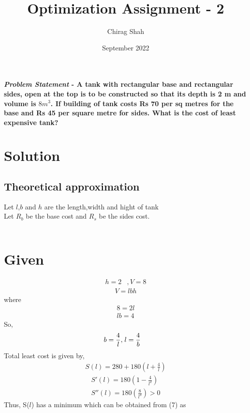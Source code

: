 \documentclass[journal,10pt,twocolumn]{article}
\title{\textbf{Optimization Assignment - 2}}
\author{Chirag Shah}
\date{September 2022}
\providecommand{\brak}[1]{\ensuremath{\left(#1\right)}}
\begin{document}
\maketitle
\paragraph{\textit{Problem Statement} - A tank with rectangular base and rectangular sides, open at the top is to be constructed so that its depth is 2 m and volume is $8 m^3$. If building of tank costs Rs 70 per sq metres for the base and Rs 45 per square metre for sides. What is the cost of least expensive tank?}

\section*{\large Solution}
\subsection*{\normalsize Theoretical approximation}
Let $l$,$b$ and $h$ are the length,width and hight of tank \\
Let $R_b$ be the base cost and $R_s$ be the sides cost.\\\ \vspace{2mm}

\section*{\large Given}
\begin{align}
h=2 &, V=8
\end{align}
\begin{align}
	V = lbh
\end{align}
where
\begin{align}
	8=2l\\
	lb=4
\end{align}
So,
\begin{align}
	b=\frac{4}{l},\hspace{1mm} & l=\frac{4}{b}
\end{align}
Total least cost is given by,\\ \vspace{1mm}
\begin{align}
    S(l)=280+180\brak{l+\frac{4}{l}}
\end{align}
\begin{align}
	S'(l)=180\brak{1-\frac{4}{l^2}}\\
        S''(l)= 180\brak{\frac{8}{l^3}} > 0
\end{align}
Thus, S($l$) has a minimum which can be obtained from (7) as \\
\end{document}
